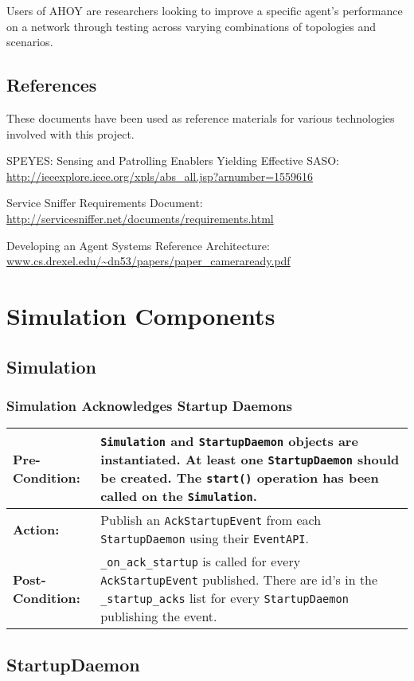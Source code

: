 \documentclass[titlepage]{article}
\renewenvironment{itemize*}
    {\begin{itemize}
        \setlength{\itemsep}{0pt}%
        \setlength{\parskip}{0pt}%
        \setlength{\partopsep}{0pt}%
        \setlength{\topsep}{0pt}}%
    {\end{itemize}}
\newcommand{\testcase}[3]{
    \begin{center}
    \begin{tabular}{| l | p{0.7\textwidth}|}
        \hline
        \rowcolor[gray]{0.8}\textbf{Pre-Condition:} & #1 \\ \hline
        \textbf{Action:} & #2 \\ \hline
        \rowcolor[gray]{0.8}\textbf{Post-Condition:} & #3 \\ \hline
    \end{tabular}
    \end{center}
}
\begin{document}
Users of AHOY are researchers looking to improve a specific agent's performance on a network through testing across varying combinations of topologies and scenarios.

\subsection{References%
  \label{references}%
}

These documents have been used as reference materials for various technologies involved with this project.
%
\begin{itemize*}
	\item SPEYES: Sensing and Patrolling Enablers Yielding Effective SASO: \url{http://ieeexplore.ieee.org/xpls/abs\_all.jsp?arnumber=1559616}
	\item Service Sniffer Requirements Document: \url{http://servicesniffer.net/documents/requirements.html}
    \item Developing an Agent Systems Reference Architecture: \url{www.cs.drexel.edu/~dn53/papers/paper\_cameraready.pdf}
\end{itemize*}

\section{Simulation Components}
\subsection{Simulation}

\subsubsection{Simulation Acknowledges Startup Daemons}

\testcase{\texttt{Simulation} and \texttt{StartupDaemon} objects are instantiated. At least one \texttt{StartupDaemon} should be created. The \texttt{start()} operation has been called on the \texttt{Simulation}. }{Publish an \texttt{AckStartupEvent} from each \texttt{StartupDaemon} using their \texttt{EventAPI}.}{\texttt{\_on\_ack\_startup} is called for every \texttt{AckStartupEvent} published.  There are id's in the \texttt{\_startup\_acks} list for every \texttt{StartupDaemon} publishing the event.}

\subsection{StartupDaemon}
\end{document}
